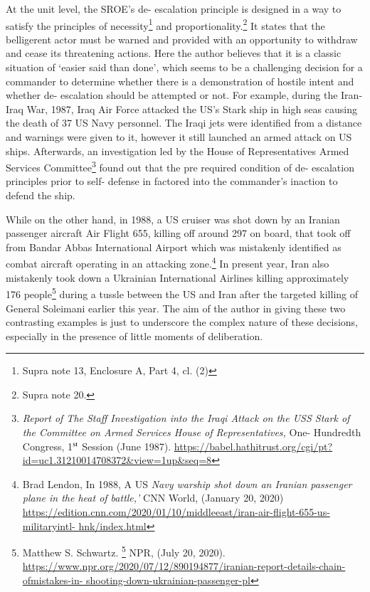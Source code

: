 \begin{multicols}{2}
\noi
At the unit level, the SROE’s de- escalation principle is designed in a way to satisfy the
principles of necessity\footnote{Supra note 13, Enclosure A, Part 4, cl. (2)} and proportionality.\footnote{Supra note 20.}  It states that the belligerent actor must be
warned and provided with an opportunity to withdraw and cease its threatening actions.
Here the author believes that it is a classic situation of ‘easier said than done’, which seems
to be a challenging decision for a commander to determine whether there is a demonstration
of hostile intent and whether de- escalation should be attempted or not. For example,
during the Iran- Iraq War, 1987, Iraq Air Force attacked the US’s Stark ship in high seas causing the death of 37 US Navy personnel. The Iraqi jets were identified from a distance
and warnings were given to it, however it still launched an armed attack on US ships.
Afterwards, an investigation led by the House of Representatives Armed Services
Committee\footnote{\textit{Report of The Staff Investigation into the Iraqi Attack on the USS Stark of the Committee on Armed Services House of Representatives,} One- Hundredth Congress, 1$^{\rm st}$ Session (June 1987).
\url{https://babel.hathitrust.org/cgi/pt?id=uc1.31210014708372&view=1up&seq=8}}  found out that the pre required condition of de- escalation principles prior to
self- defense in factored into the commander’s inaction to defend the ship.

\noi
While on the other hand, in 1988, a US cruiser was shot down by an Iranian passenger
aircraft Air Flight 655, killing off around 297 on board, that took off from Bandar
Abbas International Airport which was mistakenly identified as combat aircraft operating
in an attacking zone.\footnote{Brad Lendon, In 1988, A US \textit{Navy warship shot down an Iranian passenger plane in the heat of battle,’} CNN World, (January 20, 2020)  \url{https://edition.cnn.com/2020/01/10/middleeast/iran-air-flight-655-us-militaryintl- hnk/index.html}} In present year, Iran also mistakenly took down a Ukrainian 
International Airlines killing approximately 176 people\footnote{Matthew S. Schwartz. \footnote{Iranian Report Details Chain of Mistakes In Shooting Down Ukrainian Passenger
Plane,} NPR, (July 20, 2020).  \url{https://www.npr.org/2020/07/12/890194877/iranian-report-details-chain-ofmistakes-in- shooting-down-ukrainian-passenger-pl}} during a tussle between the US
and Iran after the targeted killing of General Soleimani earlier this year. The aim of the
author in giving these two contrasting examples is just to underscore the complex nature of
these decisions, especially in the presence of little moments of deliberation.


\end{multicols}
